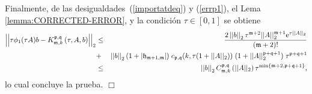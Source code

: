 Finalmente, de las desigualdades~(\ref{importatdeq}) y (\ref{errp1}), el Lema \ref{lemma:CORRECTED-ERROR}, y la condición $\tau \in [0,1]$ se obtiene
\begin{eqnarray*}
	\left\lvert\left\lvert  \tau \phi_1(\tau A)b-  K_{\mathfrak{m},k}^{\mathfrak{p},\mathfrak{q}}\left( \tau,  A , b \right)\right\rvert\right\rvert_2
	&\leq& \frac{2 \left\lvert \left\lvert b \right\rvert \right\rvert_2 \tau^{\mathfrak{m}+2}  \vert\lvert A\rvert\rvert^{\mathfrak{m}+1}_2
		\mathrm{e}^{\tau \lvert\lvert A\rvert\rvert_2}}{(\mathfrak{m}+2)!}\\
	&+&
	\left\lvert \left\lvert b \right\rvert \right\rvert_2 (1+\lvert\mathfrak{h}_{\mathfrak{m}+1,\mathfrak{m}}\rvert) \; c_{\mathfrak{p},\mathfrak{q}}(k,\tau (1+\lvert\lvert A \rvert\rvert_2))
	\; (1 + \lvert\lvert A \rvert\rvert_2^{\mathfrak{p}+\mathfrak{q}+1}) \; \tau^{\mathfrak{p}+\mathfrak{q}+1}\\
	& \leq & \left\lvert \left\lvert b \right\rvert \right\rvert_2 C_{\mathfrak{m},k}^{\mathfrak{p},\mathfrak{q}}\left(\lvert\lvert A \rvert\rvert_2\right)\tau^{\mathrm{min}\left\{ \mathfrak{m}+2,\mathfrak{p}+\mathfrak{q}+1 \right\}},
\end{eqnarray*}
lo cual concluye la prueba.
$\Box$

